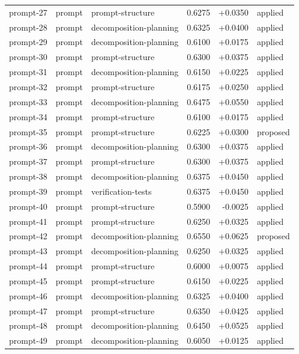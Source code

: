 \begin{center}
\begin{longtable}{llp{5.2cm}rrl}
prompt-27 & prompt & prompt-structure & 0.6275 & +0.0350 & applied \\
prompt-28 & prompt & decomposition-planning & 0.6325 & +0.0400 & applied \\
prompt-29 & prompt & decomposition-planning & 0.6100 & +0.0175 & applied \\
prompt-30 & prompt & prompt-structure & 0.6300 & +0.0375 & applied \\
prompt-31 & prompt & decomposition-planning & 0.6150 & +0.0225 & applied \\
prompt-32 & prompt & prompt-structure & 0.6175 & +0.0250 & applied \\
prompt-33 & prompt & decomposition-planning & 0.6475 & +0.0550 & applied \\
prompt-34 & prompt & prompt-structure & 0.6100 & +0.0175 & applied \\
prompt-35 & prompt & prompt-structure & 0.6225 & +0.0300 & proposed \\
prompt-36 & prompt & decomposition-planning & 0.6300 & +0.0375 & applied \\
prompt-37 & prompt & prompt-structure & 0.6300 & +0.0375 & applied \\
prompt-38 & prompt & decomposition-planning & 0.6375 & +0.0450 & applied \\
prompt-39 & prompt & verification-tests & 0.6375 & +0.0450 & applied \\
prompt-40 & prompt & prompt-structure & 0.5900 & -0.0025 & applied \\
prompt-41 & prompt & prompt-structure & 0.6250 & +0.0325 & applied \\
prompt-42 & prompt & decomposition-planning & 0.6550 & +0.0625 & proposed \\
prompt-43 & prompt & decomposition-planning & 0.6250 & +0.0325 & applied \\
prompt-44 & prompt & prompt-structure & 0.6000 & +0.0075 & applied \\
prompt-45 & prompt & prompt-structure & 0.6150 & +0.0225 & applied \\
prompt-46 & prompt & decomposition-planning & 0.6325 & +0.0400 & applied \\
prompt-47 & prompt & prompt-structure & 0.6350 & +0.0425 & applied \\
prompt-48 & prompt & decomposition-planning & 0.6450 & +0.0525 & applied \\
prompt-49 & prompt & decomposition-planning & 0.6050 & +0.0125 & applied \\

\end{longtable}
\end{center}
